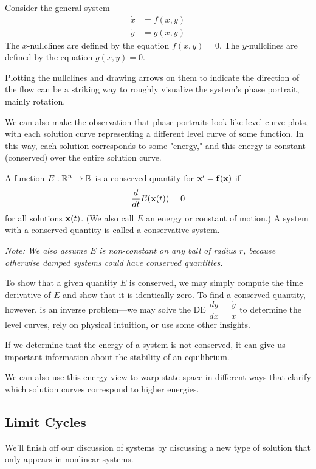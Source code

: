 \documentclass[../m082main.tex]{subfiles}
\begin{document}
\begin{definition}[Nullclines]
    Consider the general system
    \begin{align*}
        \dot x &= f(x,y) \\
        \dot y &= g(x,y)
    \end{align*}
    The $x$-nullclines are defined by the equation $f(x,y) = 0$.
    The $y$-nullclines are defined by the equation $g(x,y) = 0$.
\end{definition}

Plotting the nullclines and drawing arrows on them to indicate the direction of the flow can be a striking way to roughly visualize the system's phase portrait, mainly rotation.

We can also make the observation that phase portraits look like level curve plots, with each solution curve representing a different level curve of some function.
In this way, each solution corresponds to some "energy," and this energy is constant (conserved) over the entire solution curve.

\begin{definition}
    A function $E : \mathbb{R}^n \to \mathbb{R}$ is a conserved quantity for $\mathbf{x}' = \mathbf{f} (\mathbf{x})$ if
    \[ \frac{d}{dt} E (\mathbf{x} (t)) = 0 \]
    for all solutions $\mathbf{x} (t)$.
    (We also call $E$ an energy or constant of motion.)
    A system with a conserved quantity is called a conservative system.

    \textit{Note: We also assume $E$ is non-constant on any ball of radius $r$, because otherwise damped systems could have conserved quantities.}
\end{definition}

To show that a given quantity $E$ is conserved, we may simply compute the time derivative of $E$ and show that it is identically zero.
To find a conserved quantity, however, is an inverse problem---we may solve the DE $\dfrac{dy}{dx} = \dfrac{\dot y}{\dot x}$ to determine the level curves, rely on physical intuition, or use some other insights.

If we determine that the energy of a system is not conserved, it can give us important information about the stability of an equilibrium.

We can also use this energy view to warp state space in different ways that clarify which solution curves correspond to higher energies.

\subsection{Limit Cycles}
We'll finish off our discussion of systems by discussing a new type of solution that only appears in nonlinear systems.
\end{document}
